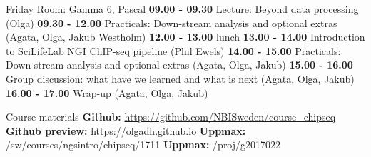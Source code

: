 \documentclass{beamer}\usepackage[]{graphicx}\usepackage[]{color}
\begin{document}
\begin{frame}
\begin{block}{Friday}
\scriptsize
\vspace{4mm}
Room: Gamma 6, Pascal \newline \newline
\textbf{09.00 - 09.30} Lecture: Beyond data processing (Olga) \newline \newline
\textbf{09.30 - 12.00} Practicals: Down-stream analysis and optional extras (Agata, Olga, Jakub Westholm) \newline \newline
\textbf{12.00 - 13.00} lunch \newline \newline
\textbf{13.00 - 14.00} Introduction to SciLifeLab NGI ChIP-seq pipeline (Phil Ewels) \newline \newline
\textbf{14.00 - 15.00} Practicals: Down-stream analysis and optional extras (Agata, Olga, Jakub) \newline \newline
\textbf{15.00 - 16.00} Group discussion: what have we learned and what is next (Agata, Olga, Jakub) \newline \newline
\textbf{16.00 - 17.00} Wrap-up (Agata, Olga, Jakub) \newline \newline
\end{block}
\end{frame}

\begin{frame}[t]
\begin{block}{Course materials}
\small
\vspace{4mm}
\textbf{Github:} \hyperlink{https://github.com/NBISweden/course_chipseq}{https://github.com/NBISweden/course\_chipseq} \newline \newline
\textbf{Github preview:} \hyperlink{https://olgadh.github.io}{https://olgadh.github.io} \newline \newline
\textbf{Uppmax:} /sw/courses/ngsintro/chipseq/1711 \newline \newline
\textbf{Uppmax:} /proj/g2017022 
\end{block}
\end{frame}
\end{document}
